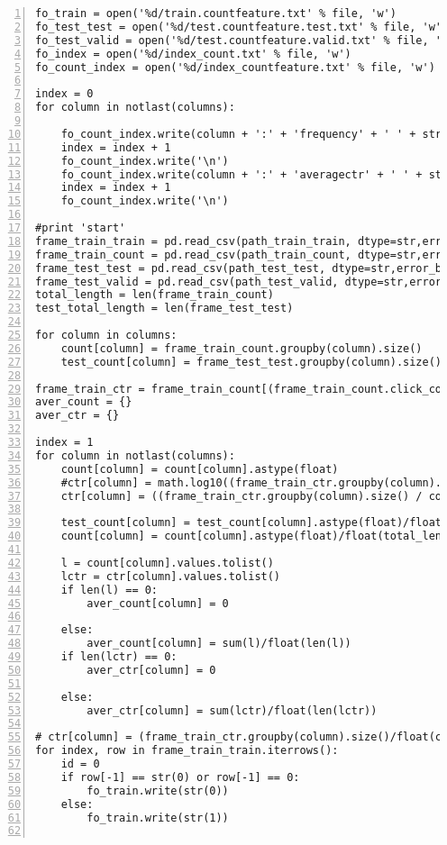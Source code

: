 \begin{lstlisting}[numbers=left, breaklines=true]
fo_train = open('%d/train.countfeature.txt' % file, 'w')
fo_test_test = open('%d/test.countfeature.test.txt' % file, 'w')
fo_test_valid = open('%d/test.countfeature.valid.txt' % file, 'w')
fo_index = open('%d/index_count.txt' % file, 'w')
fo_count_index = open('%d/index_countfeature.txt' % file, 'w')

index = 0
for column in notlast(columns):

    fo_count_index.write(column + ':' + 'frequency' + ' ' + str(index))
    index = index + 1
    fo_count_index.write('\n')
    fo_count_index.write(column + ':' + 'averagectr' + ' ' + str(index))
    index = index + 1
    fo_count_index.write('\n')

#print 'start'
frame_train_train = pd.read_csv(path_train_train, dtype=str,error_bad_lines = False)
frame_train_count = pd.read_csv(path_train_count, dtype=str,error_bad_lines = False)
frame_test_test = pd.read_csv(path_test_test, dtype=str,error_bad_lines = False)
frame_test_valid = pd.read_csv(path_test_valid, dtype=str,error_bad_lines = False)
total_length = len(frame_train_count)
test_total_length = len(frame_test_test)

for column in columns:
    count[column] = frame_train_count.groupby(column).size()
    test_count[column] = frame_test_test.groupby(column).size()

frame_train_ctr = frame_train_count[(frame_train_count.click_count == str(1))]
aver_count = {}
aver_ctr = {}

index = 1
for column in notlast(columns):
    count[column] = count[column].astype(float)
    #ctr[column] = math.log10((frame_train_ctr.groupby(column).size() / count[column]).fillna(0) + math.pow(10, -100))
    ctr[column] = ((frame_train_ctr.groupby(column).size() / count[column]).fillna(0))

    test_count[column] = test_count[column].astype(float)/float(test_total_length)
    count[column] = count[column].astype(float)/float(total_length)

    l = count[column].values.tolist()
    lctr = ctr[column].values.tolist()
    if len(l) == 0:
        aver_count[column] = 0

    else:
        aver_count[column] = sum(l)/float(len(l))
    if len(lctr) == 0:
        aver_ctr[column] = 0

    else:
        aver_ctr[column] = sum(lctr)/float(len(lctr))
        
# ctr[column] = (frame_train_ctr.groupby(column).size()/float(count[column])).fillna(0)
for index, row in frame_train_train.iterrows():
    id = 0
    if row[-1] == str(0) or row[-1] == 0:
        fo_train.write(str(0))
    else:
        fo_train.write(str(1))


\end{lstlisting}
